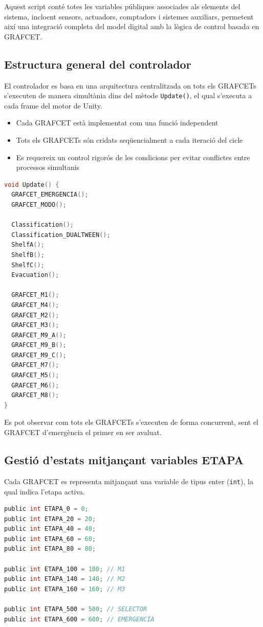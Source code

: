 \documentclass[12pt,a4paper]{report}
\begin{document}
Aquest script conté totes les variables públiques associades als elements del sistema, incloent sensors, actuadors, comptadors i sistemes auxiliars, permetent així una integració completa del model digital amb la lògica de control basada en GRAFCET.

\subsection{Estructura general del controlador}

El controlador es basa en una arquitectura centralitzada on tots els GRAFCETs s'executen de manera simultània dins del mètode \texttt{Update()}, el qual s'executa a cada frame del motor de Unity.

\begin{itemize}
\item Cada GRAFCET està implementat com una funció independent
\item Tots els GRAFCETs són cridats seqüencialment a cada iteració del cicle
\item Es requereix un control rigorós de les condicions per evitar conflictes entre processos simultanis
\end{itemize}

\begin{lstlisting}[language=C]
void Update() {
  GRAFCET_EMERGENCIA();
  GRAFCET_MODO();

  Classification();
  Classification_DUALTWEEN();
  ShelfA();
  ShelfB();
  ShelfC();
  Evacuation();

  GRAFCET_M1();
  GRAFCET_M4();
  GRAFCET_M2();
  GRAFCET_M3();
  GRAFCET_M9_A();
  GRAFCET_M9_B();
  GRAFCET_M9_C();
  GRAFCET_M7();
  GRAFCET_M5();
  GRAFCET_M6();
  GRAFCET_M8();
}
\end{lstlisting}

Es pot observar com tots els GRAFCETs s'executen de forma concurrent, sent el GRAFCET d'emergència el primer en ser avaluat.

\subsection{Gestió d'estats mitjançant variables ETAPA}

Cada GRAFCET es representa mitjançant una variable de tipus enter (\texttt{int}), la qual indica l'etapa activa.

\begin{lstlisting}[language=C]
public int ETAPA_0 = 0; 
public int ETAPA_20 = 20;
public int ETAPA_40 = 40;
public int ETAPA_60 = 60;
public int ETAPA_80 = 80;

public int ETAPA_100 = 100; // M1
public int ETAPA_140 = 140; // M2
public int ETAPA_160 = 160; // M3

public int ETAPA_500 = 500; // SELECTOR
public int ETAPA_600 = 600; // EMERGENCIA
\end{lstlisting}
\end{document}
